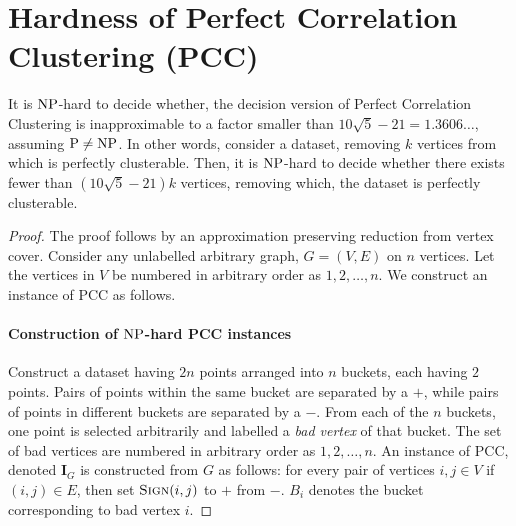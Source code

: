 \section{Hardness of Perfect Correlation Clustering (PCC)}

\begin{theorem}
It is $\mathrm{NP}$-hard to decide whether, the decision version of Perfect Correlation Clustering is inapproximable to a factor smaller than $10 \sqrt{5} - 21 = 1.3606\dots$, assuming $\mathrm{P} \ne \mathrm{NP}$. In other words, consider a dataset, removing $k$ vertices from which is perfectly clusterable. Then, it is $\mathrm{NP}$-hard to decide whether there exists fewer than $(10 \sqrt{5} - 21)k$ vertices, removing which, the dataset is perfectly clusterable.
\end{theorem}
\begin{proof}
The proof follows by an approximation preserving reduction from vertex cover. Consider any unlabelled arbitrary graph, $G = (V,E)$ on $n$ vertices. Let the vertices in $V$ be numbered in arbitrary order as $1,2,\dots,n$. We construct an instance of PCC as follows.




\paragraph{Construction of $\mathrm{NP}$-hard PCC instances}
Construct a dataset having $2n$ points arranged into $n$ buckets, each having $2$ points. Pairs of points within the same bucket are separated by a $+$, while pairs of points in different buckets are separated by a $-$. From each of the $n$ buckets, one point is selected arbitrarily and labelled a \textit{bad vertex} of that bucket. The set of bad vertices are numbered in arbitrary order as $1,2,\dots,n$. An instance of PCC, denoted $\mathbf{I}_G$ is constructed from $G$ as follows: for every pair of vertices $i,j \in V$ if $(i,j) \in E$, then set $\textsc{Sign} (i,j)$ to $+$ from $-$. $B_i$ denotes the bucket corresponding to bad vertex $i$.


\end{proof}
